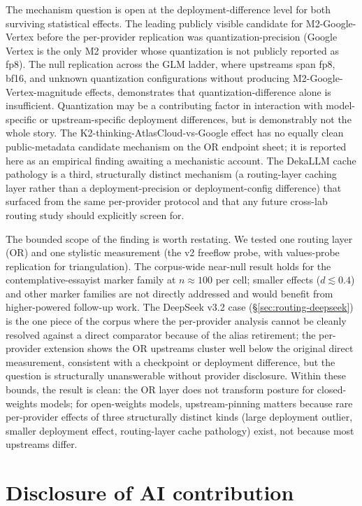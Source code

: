 \documentclass[11pt,a4paper]{article}
\begin{document}
The mechanism question is open at the deployment-difference level for both surviving statistical effects. The leading publicly visible candidate for M2-Google-Vertex before the per-provider replication was quantization-precision (Google Vertex is the only M2 provider whose quantization is not publicly reported as fp8). The null replication across the GLM ladder, where upstreams span fp8, bf16, and unknown quantization configurations without producing M2-Google-Vertex-magnitude effects, demonstrates that quantization-difference alone is insufficient. Quantization may be a contributing factor in interaction with model-specific or upstream-specific deployment differences, but is demonstrably not the whole story. The K2-thinking-AtlasCloud-vs-Google effect has no equally clean public-metadata candidate mechanism on the OR endpoint sheet; it is reported here as an empirical finding awaiting a mechanistic account. The DekaLLM cache pathology is a third, structurally distinct mechanism (a routing-layer caching layer rather than a deployment-precision or deployment-config difference) that surfaced from the same per-provider protocol and that any future cross-lab routing study should explicitly screen for.

The bounded scope of the finding is worth restating. We tested one routing layer (OR) and one stylistic measurement (the v2 freeflow probe, with values-probe replication for triangulation). The corpus-wide near-null result holds for the contemplative-essayist marker family at $n \approx 100$ per cell; smaller effects ($d \lesssim 0.4$) and other marker families are not directly addressed and would benefit from higher-powered follow-up work. The DeepSeek v3.2 case (\S\ref{sec:routing-deepseek}) is the one piece of the corpus where the per-provider analysis cannot be cleanly resolved against a direct comparator because of the alias retirement; the per-provider extension shows the OR upstreams cluster well below the original direct measurement, consistent with a checkpoint or deployment difference, but the question is structurally unanswerable without provider disclosure. Within these bounds, the result is clean: the OR layer does not transform posture for closed-weights models; for open-weights models, upstream-pinning matters because rare per-provider effects of three structurally distinct kinds (large deployment outlier, smaller deployment effect, routing-layer cache pathology) exist, not because most upstreams differ.

\section{Disclosure of AI contribution}
\label{sec:ai-contribution}
\end{document}
